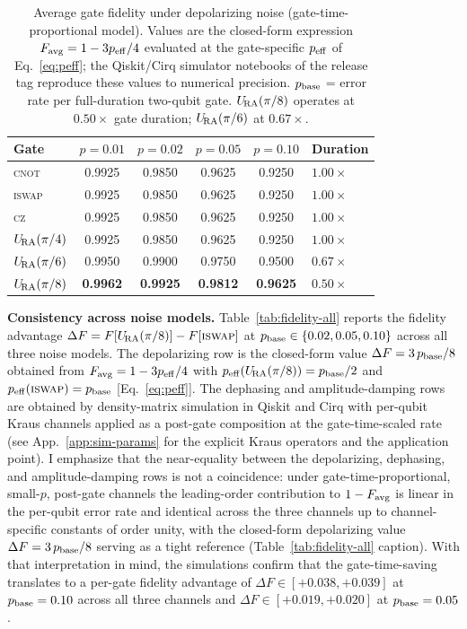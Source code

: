 \begin{table}[htbp]
\centering
\caption{Average gate fidelity under depolarizing noise (gate-time-proportional
model). Values are the closed-form expression
$F_{\rm avg} = 1 - 3 p_{\rm eff}/4$ evaluated at the gate-specific
$p_{\rm eff}$ of Eq.~\eqref{eq:peff}; the Qiskit/Cirq simulator
notebooks of the release tag reproduce these values to numerical
precision. $p_{\rm base}$ = error rate per full-duration two-qubit
gate. $U_{\!\mathrm{RA}}(\pi/8)$ operates at $0.50\times$ gate duration;
$U_{\!\mathrm{RA}}(\pi/6)$ at $0.67\times$.}
\label{tab:fidelity}
\begin{tabular}{lccccl}
\toprule
Gate & $p=0.01$ & $p=0.02$ & $p=0.05$ & $p=0.10$ & Duration \\
\midrule
\textsc{cnot}    & 0.9925 & 0.9850 & 0.9625 & 0.9250 & $1.00\times$ \\
\textsc{iswap}   & 0.9925 & 0.9850 & 0.9625 & 0.9250 & $1.00\times$ \\
\textsc{cz}      & 0.9925 & 0.9850 & 0.9625 & 0.9250 & $1.00\times$ \\
\midrule
$U_{\!\mathrm{RA}}(\pi/4)$    & 0.9925 & 0.9850 & 0.9625 & 0.9250 & $1.00\times$ \\
$U_{\!\mathrm{RA}}(\pi/6)$    & 0.9950 & 0.9900 & 0.9750 & 0.9500 & $0.67\times$ \\
$U_{\!\mathrm{RA}}(\pi/8)$    & \textbf{0.9962} & \textbf{0.9925} & \textbf{0.9812} & \textbf{0.9625} & $0.50\times$ \\
\bottomrule
\end{tabular}
\end{table}

\textbf{Consistency across noise models.}
Table~\ref{tab:fidelity-all} reports the fidelity advantage
$\Delta F = F[U_{\!\mathrm{RA}}(\pi/8)] - F[\textsc{iswap}]$ at $p_{\rm base} \in \{0.02, 0.05, 0.10\}$
across all three noise models.
The depolarizing row is the closed-form value
$\Delta F = 3\,p_{\rm base}/8$ obtained from $F_{\rm avg} = 1 - 3 p_{\rm eff}/4$
with $p_{\rm eff}(U_{\!\mathrm{RA}}(\pi/8)) = p_{\rm base}/2$ and
$p_{\rm eff}(\textsc{iswap}) = p_{\rm base}$ [Eq.~\eqref{eq:peff}].
The dephasing and amplitude-damping rows are obtained by
density-matrix simulation in Qiskit and Cirq with per-qubit Kraus
channels applied as a post-gate composition at the
gate-time-scaled rate (see App.~\ref{app:sim-params} for the explicit
Kraus operators and the application point).
I emphasize that the near-equality between the depolarizing,
dephasing, and amplitude-damping rows is not a coincidence: under
gate-time-proportional, small-$p$, post-gate channels the leading-order
contribution to $1 - F_{\rm avg}$ is linear in the per-qubit error rate
and identical across the three channels up to channel-specific
constants of order unity, with the closed-form depolarizing value
$\Delta F = 3\,p_{\rm base}/8$ serving as a tight reference
(Table~\ref{tab:fidelity-all} caption).
With that interpretation in mind, the simulations confirm that the
gate-time-saving translates to a per-gate fidelity advantage of
$\Delta F \in [+0.038, +0.039]$ at $p_{\rm base} = 0.10$ across all
three channels and $\Delta F \in [+0.019, +0.020]$ at
$p_{\rm base} = 0.05$.


